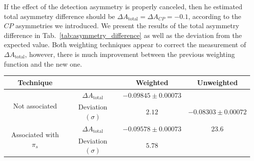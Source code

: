 \documentclass{article}
\begin{document}
        If the effect of the detection asymmetry is properly canceled, then he estimated total asymmetry difference should be $\Delta A_\text{total} = \Delta A_{CP} = -0.1$, according to the $CP$ asymmetries we introduced. 
        We present the results of the total asymmetry difference in Tab.~\ref{tab:asymmetry_difference} as well as the deviation from the expected value.
        Both weighting techniques appear to correct the measurement of $\Delta A_\text{total}$, however, there is much improvement between the previous weighting function and the new one.
        \begin{center}
                \begin{tabular}{c|c|c|c}
                        Technique& & Weighted & Unweighted\\
                        \hline\hline
                        \multirow{2}{*}{Not associated} & $\Delta A_\text{total}$ & $-0.09845 \pm 0.00073$ & \\
                        & Deviation $(\sigma)$ & $2.12$ & $-0.08303 \pm 0.00072$\\
                        \cline{1-3}
                        \multirow{2}{*}{Associated with $\pi_s$} & $\Delta A_\text{total}$ & $-0.09578 \pm 0.00073$ & $23.6$\\
                        & Deviation $(\sigma)$ & $5.78$ & \\
                \end{tabular}
                \label{tab:asymmetry_difference}
        \end{center}
\end{document}
